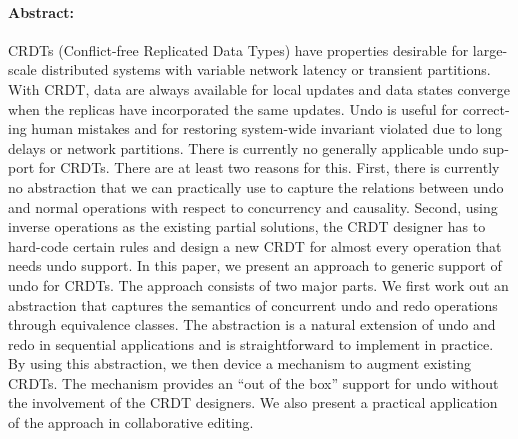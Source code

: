\begin{otherlanguage}{english}
\paragraph{Abstract:} CRDTs (Conflict-free Replicated Data Types) have properties desirable for large-scale distributed systems with variable network latency or transient partitions.
With CRDT, data are always available for local updates and data states converge when the replicas have incorporated the same updates.
Undo is useful for correcting human mistakes and for restoring system-wide invariant violated due to long delays or network partitions.
There is currently no generally applicable undo support for CRDTs.
There are at least two reasons for this. First, there is currently no abstraction that we can practically use to capture the relations between undo and normal operations with respect to concurrency and causality. 
Second, using inverse operations as the existing partial solutions, the CRDT designer has to hard-code certain rules and design a new CRDT for almost every operation that needs undo support.
In this paper, we present an approach to generic support of undo for CRDTs. The approach consists of two major parts.
We first work out an abstraction that captures the semantics of concurrent undo and redo operations through equivalence classes.
The abstraction is a natural extension of undo and redo in sequential applications and is straightforward to implement in practice.
By using this abstraction, we then device a mechanism to augment existing CRDTs.
The mechanism provides an ``out of the box'' support for undo without the involvement of the CRDT designers.
We also present a practical application of the approach in collaborative editing.
\end{otherlanguage}


